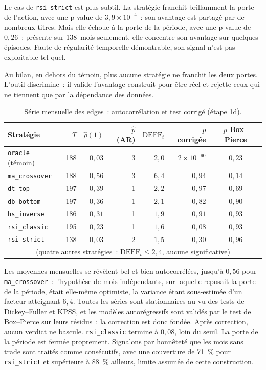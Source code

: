 Le cas de \texttt{rsi\_strict} est plus subtil. La stratégie franchit
brillamment la porte de l'action, avec une p-value de
$3{,}9\times10^{-4}$~: son avantage est partagé par de nombreux titres.
Mais elle échoue à la porte de la période, avec une p-value de
$0{,}26$~: présente sur 138~mois seulement, elle concentre son avantage
sur quelques épisodes. Faute de régularité temporelle démontrable, son
signal n'est pas exploitable tel quel.

Au bilan, en dehors du témoin, plus aucune stratégie ne franchit les
deux portes. L'outil discrimine~: il valide l'avantage construit pour
être réel et rejette ceux qui ne tiennent que par la dépendance des
données.

\begin{table}[H]
\centering
\caption{Série mensuelle des edges~: autocorrélation et test corrigé (étape 1d).}
\label{tab:b1-dep-mensuel}
\small
\begin{tabular}{@{}lrrrrrc@{}}
\toprule
Stratégie & $T$ & $\hat\rho(1)$ & $\hat p$ (AR) & $\mathrm{DEFF}_t$ & $p$ corrigée & $p$ Box--Pierce \\
\midrule
\texttt{oracle} (témoin) & 188 & $0{,}03$ & 3 & $2{,}0$ & $2\times10^{-90}$ & $0{,}23$ \\
\midrule
\texttt{ma\_crossover} & 188 & $0{,}56$ & 3 & $6{,}4$ & $0{,}94$ & $0{,}14$ \\
\texttt{dt\_top}       & 197 & $0{,}39$ & 1 & $2{,}2$ & $0{,}97$ & $0{,}69$ \\
\texttt{db\_bottom}    & 197 & $0{,}36$ & 1 & $2{,}1$ & $0{,}82$ & $0{,}90$ \\
\texttt{hs\_inverse}   & 186 & $0{,}31$ & 1 & $1{,}9$ & $0{,}91$ & $0{,}93$ \\
\texttt{rsi\_classic}  & 195 & $0{,}23$ & 1 & $1{,}6$ & $0{,}08$ & $0{,}93$ \\
\texttt{rsi\_strict}   & 138 & $0{,}03$ & 2 & $1{,}5$ & $0{,}30$ & $0{,}96$ \\
\multicolumn{7}{c}{\footnotesize (quatre autres stratégies~: $\mathrm{DEFF}_t \le 2{,}4$, aucune significative)} \\
\bottomrule
\end{tabular}
\end{table}

Les moyennes mensuelles se révèlent bel et bien autocorrélées, jusqu'à
$0{,}56$ pour \texttt{ma\_crossover}~: l'hypothèse de mois indépendants,
sur laquelle reposait la porte de la période, était elle-même optimiste,
la variance étant sous-estimée d'un facteur atteignant $6{,}4$. Toutes
les séries sont stationnaires au vu des tests de Dickey--Fuller et KPSS,
et les modèles autorégressifs sont validés par le test de Box--Pierce
sur leurs résidus~: la correction est donc fondée. Après correction,
aucun verdict ne bascule. \texttt{rsi\_classic} termine à $0{,}08$, loin
du seuil. La porte de la période est fermée proprement. Signalons par
honnêteté que les mois sans trade sont traités comme consécutifs, avec
une couverture de 71~\% pour \texttt{rsi\_strict} et supérieure à 88~\%
ailleurs, limite assumée de cette construction.

